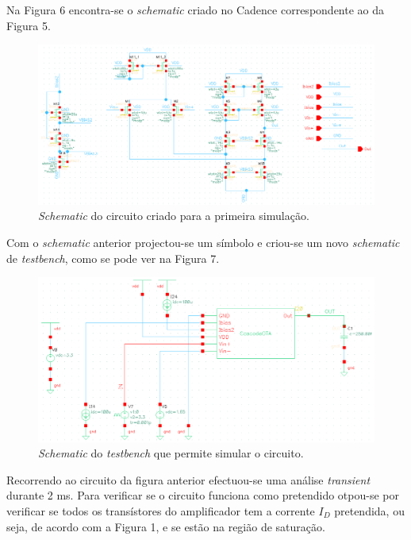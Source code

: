 \documentclass[11pt]{article}
\numberwithin{equation}{section}
\begin{document}
Na Figura 6 encontra-se o \textit{schematic} criado no Cadence correspondente ao da Figura 5.

\begin{figure}[H]
	\centering
	\includegraphics[keepaspectratio=true, scale=0.70]{exps/Woriginais}
	\vspace{-0.5em}
	\caption{\textit{Schematic} do circuito criado para a primeira simulação.}
	\vspace{-0.8em}
\end{figure} 

Com o \textit{schematic} anterior projectou-se um símbolo e criou-se um novo \textit{schematic} de \textit{testbench}, como se pode ver na Figura 7.

\begin{figure}[H]
	\centering
	\includegraphics[keepaspectratio=true, scale=0.47]{exps/testbench}
	\vspace{-0.5em}
	\caption{\textit{Schematic} do \textit{testbench} que permite simular o circuito.}
	\vspace{-0.8em}
\end{figure} 

Recorrendo ao circuito da figura anterior efectuou-se uma análise \textit{transient} durante 2 ms. Para verificar se o circuito funciona como pretendido otpou-se por verificar se todos os transístores do amplificador tem a corrente $I_D$ pretendida, ou seja, de acordo com a Figura 1, e se estão na região de saturação.
\end{document}
